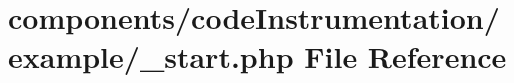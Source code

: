 \hypertarget{components_2code_instrumentation_2example_2__start_8php}{
\section{components/codeInstrumentation/example/\_\-start.php File Reference}
\label{components_2code_instrumentation_2example_2__start_8php}
}
